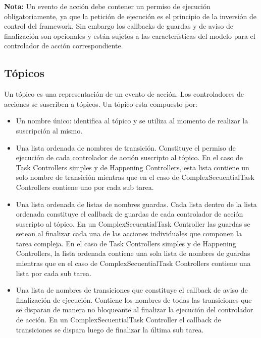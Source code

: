 \begin{framed}
\textbf{Nota:} Un evento de acción debe contener un permiso de ejecución
obligatoriamente, ya que la petición de ejecución es el principio de la
inversión de control del framework. Sin embargo los callbacks de guardas y de
aviso de finalización son opcionales y están sujetos a las características del
modelo para el controlador de acción correspondiente.
\end{framed}

\subsection{Tópicos}
\label{sec:diseno_topicos}
Un tópico es una representación de un evento de acción. Los controladores de
acciones se suscriben a tópicos.
Un tópico esta compuesto por:
\begin{itemize}
  \item Un nombre único: identifica al tópico y se utiliza al momento de
  realizar la suscripción al mismo.
  \item Una lista ordenada de nombres de transición. Constituye el permiso
  de ejecución de cada controlador de acción suscripto al tópico. En el caso de
  Task Controllers simples y de Happening Controllers, esta lista contiene
  un solo nombre de transición mientras que en el caso de ComplexSecuentialTask
  Controllers contiene uno por cada sub tarea.
  \item Una lista ordenada de listas de nombres guardas. Cada lista
   dentro de la lista ordenada constituye el callback de guardas de cada
   controlador de acción suscripto al tópico. En un ComplexSecuentialTask
   Controller las guardas se setean al finalizar cada una de las acciones
   individuales que componen la tarea compleja. En el caso de
  Task Controllers simples y de Happening Controllers, la lista ordenada
  contiene una sola lista de nombres de guardas mientras que en el caso de
  ComplexSecuentialTask Controllers contiene una lista por cada sub tarea.
  \item Una lista de nombres de transiciones que constituye el callback de
  aviso de finalización de ejecución. Contiene los nombres de todas las
  transiciones que se disparan de manera no bloqueante al finalizar la ejecución
  del controlador de acción. En un  ComplexSecuentialTask
  Controller el callback de transiciones se dispara luego de finalizar la última
  sub tarea.
\end{itemize}
